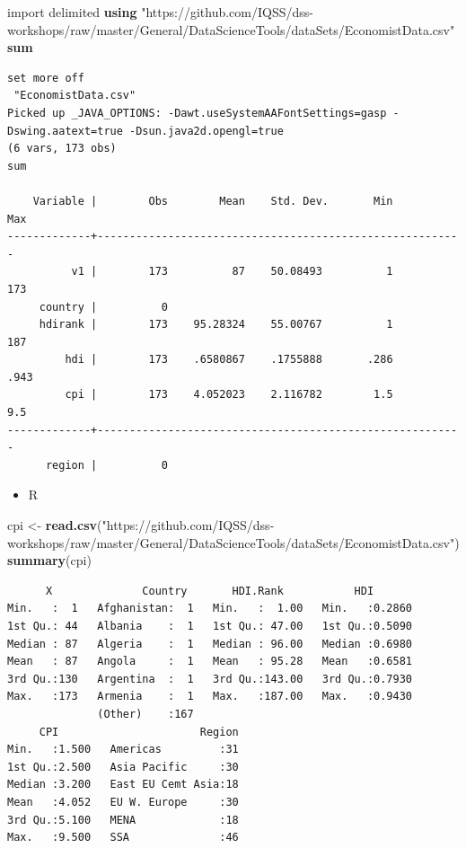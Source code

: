 \documentclass[
]{book}
\newenvironment{Shaded}{\begin{snugshade}}{\end{snugshade}}
\newcommand{\KeywordTok}[1]{\textcolor[rgb]{0.13,0.29,0.53}{\textbf{#1}}}
\newcommand{\NormalTok}[1]{#1}
\newcommand{\StringTok}[1]{\textcolor[rgb]{0.31,0.60,0.02}{#1}}
\providecommand{\tightlist}{%
  \setlength{\itemsep}{0pt}\setlength{\parskip}{0pt}}
\begin{document}
\begin{Shaded}
\begin{Highlighting}[]
\NormalTok{import delimited }\KeywordTok{using} \StringTok{"https://github.com/IQSS/dss{-}workshops/raw/master/General/DataScienceTools/dataSets/EconomistData.csv"}
\KeywordTok{sum}
\end{Highlighting}
\end{Shaded}

\begin{verbatim}
set more off
 "EconomistData.csv"
Picked up _JAVA_OPTIONS: -Dawt.useSystemAAFontSettings=gasp -Dswing.aatext=true -Dsun.java2d.opengl=true
(6 vars, 173 obs)
sum

    Variable |        Obs        Mean    Std. Dev.       Min        Max
-------------+---------------------------------------------------------
          v1 |        173          87    50.08493          1        173
     country |          0
     hdirank |        173    95.28324    55.00767          1        187
         hdi |        173    .6580867    .1755888       .286       .943
         cpi |        173    4.052023    2.116782        1.5        9.5
-------------+---------------------------------------------------------
      region |          0
\end{verbatim}

\begin{itemize}
\tightlist
\item
  R
\end{itemize}

\begin{Shaded}
\begin{Highlighting}[]
\NormalTok{cpi \textless{}{-}}\StringTok{ }\KeywordTok{read.csv}\NormalTok{(}\StringTok{"https://github.com/IQSS/dss{-}workshops/raw/master/General/DataScienceTools/dataSets/EconomistData.csv"}\NormalTok{)}
\KeywordTok{summary}\NormalTok{(cpi)}
\end{Highlighting}
\end{Shaded}

\begin{verbatim}
      X              Country       HDI.Rank           HDI        
Min.   :  1   Afghanistan:  1   Min.   :  1.00   Min.   :0.2860  
1st Qu.: 44   Albania    :  1   1st Qu.: 47.00   1st Qu.:0.5090  
Median : 87   Algeria    :  1   Median : 96.00   Median :0.6980  
Mean   : 87   Angola     :  1   Mean   : 95.28   Mean   :0.6581  
3rd Qu.:130   Argentina  :  1   3rd Qu.:143.00   3rd Qu.:0.7930  
Max.   :173   Armenia    :  1   Max.   :187.00   Max.   :0.9430  
              (Other)    :167                                    
     CPI                      Region  
Min.   :1.500   Americas         :31  
1st Qu.:2.500   Asia Pacific     :30  
Median :3.200   East EU Cemt Asia:18  
Mean   :4.052   EU W. Europe     :30  
3rd Qu.:5.100   MENA             :18  
Max.   :9.500   SSA              :46
\end{verbatim}
\end{document}
